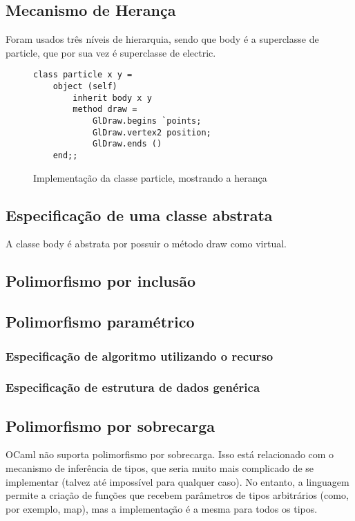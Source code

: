 \documentclass[a4paper,10pt]{article}
\begin{document}
\subsection{Mecanismo de Herança}
	Foram usados três níveis de hierarquia, sendo que body é a superclasse de particle, que por sua vez é superclasse de electric.

	\begin{figure}[H]
	\centering	
	\begin{lstlisting}
class particle x y =
	object (self)
		inherit body x y
		method draw =
			GlDraw.begins `points;
			GlDraw.vertex2 position;
			GlDraw.ends ()
	end;;
	\end{lstlisting}
	\caption{Implementação da classe particle, mostrando a herança}
\end{figure}

\subsection{Especificação de uma classe abstrata}
	A classe body é abstrata por possuir o método draw como virtual.

\subsection{Polimorfismo por inclusão}
	
\subsection{Polimorfismo paramétrico}
	\subsubsection{Especificação de algoritmo utilizando o recurso}
	
	\subsubsection{Especificação de estrutura de dados genérica}
	
\subsection{Polimorfismo por sobrecarga}
	
	OCaml não suporta polimorfismo por sobrecarga. Isso está relacionado com o mecanismo de inferência de tipos, que seria muito mais complicado de se implementar (talvez até impossível para qualquer caso). No entanto, a linguagem permite a criação de funções que recebem parâmetros de tipos arbitrários (como, por exemplo, map), mas a implementação é a mesma para todos os tipos.
\end{document}
